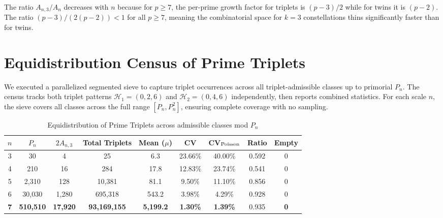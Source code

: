 \documentclass[11pt]{article}
\begin{document}
The ratio $A_{n,3}/A_n$ decreases with $n$ because for $p \geq 7$, the per-prime growth factor for triplets is $(p-3)/2$ while for twins it is $(p-2)$. The ratio $(p-3)/(2(p-2)) < 1$ for all $p \geq 7$, meaning the combinatorial space for $k=3$ constellations thins significantly faster than for twins.

\section{Equidistribution Census of Prime Triplets}

We executed a parallelized segmented sieve to capture triplet occurrences across all triplet-admissible classes up to primorial $P_n$. The census tracks both triplet patterns $\mathcal{H}_1 = (0, 2, 6)$ and $\mathcal{H}_2 = (0, 4, 6)$ independently, then reports combined statistics. For each scale $n$, the sieve covers all classes across the full range $[P_n, P_n^2]$, ensuring complete coverage with no sampling.

\begin{table}[h]
\centering
\caption{Equidistribution of Prime Triplets across admissible classes mod $P_n$}
\label{tab:triplet_census}
\begin{tabular}{ccccccccc}
\toprule
$n$ & $P_n$ & $2A_{n,3}$ & Total Triplets & Mean ($\mu$) & CV & CV$_{\rm Poisson}$ & Ratio & Empty \\
\midrule
3 & 30 & 4 & 25 & 6.3 & 23.66\% & 40.00\% & 0.592 & 0 \\
4 & 210 & 16 & 284 & 17.8 & 12.83\% & 23.74\% & 0.541 & 0 \\
5 & 2{,}310 & 128 & 10{,}381 & 81.1 & 9.50\% & 11.10\% & 0.856 & 0 \\
6 & 30{,}030 & 1{,}280 & 695{,}318 & 543.2 & 3.98\% & 4.29\% & 0.928 & 0 \\
\textbf{7} & \textbf{510{,}510} & \textbf{17{,}920} & \textbf{93{,}169{,}155} & \textbf{5{,}199.2} & \textbf{1.30\%} & \textbf{1.39\%} & 0.935 & \textbf{0} \\
\bottomrule
\end{tabular}

\vspace{0.5em}
\end{table}
\end{document}
